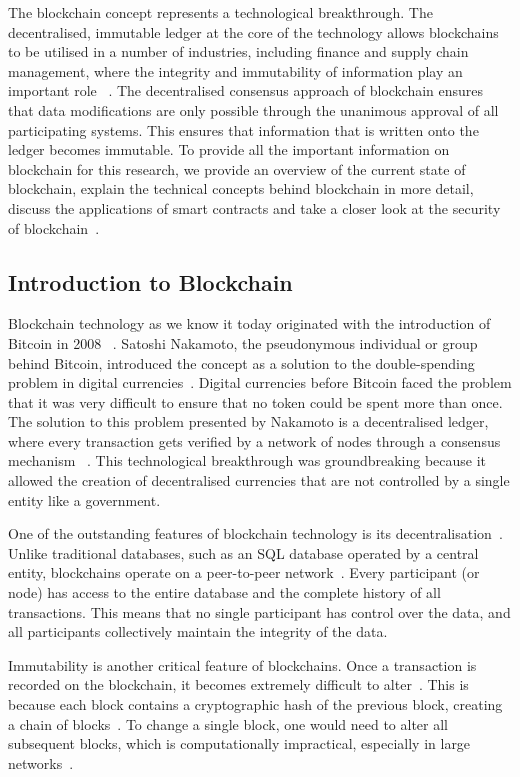 
The blockchain concept represents a technological breakthrough. The decentralised, immutable ledger  at the core of the technology allows blockchains to be utilised in a number of industries, including finance and supply chain management, where the integrity and immutability of information play an important role ~\cite{Zhou.2023}. The decentralised consensus approach of blockchain ensures that data modifications are only possible through the unanimous approval of all participating systems. This ensures that information that is written onto the ledger becomes immutable. To provide all the important information on blockchain for this research, we provide an overview of the current state of blockchain, explain the technical concepts behind blockchain in more detail, discuss the applications of smart contracts and take a closer look at the security of blockchain~\cite{Tran.2022b}.

\subsection{Introduction to Blockchain}
Blockchain technology as we know it today originated with the introduction of Bitcoin in 2008 ~\cite{Nakamoto.2009}. 
Satoshi Nakamoto, the pseudonymous individual or group behind Bitcoin, introduced the concept as a solution to the double-spending problem in digital currencies~\cite{Nakamoto.2009}. Digital currencies before Bitcoin faced the problem that it was very difficult to ensure that no token could be spent more than once. The solution to this problem presented by Nakamoto is a decentralised ledger, where every transaction gets verified by a network of nodes through a consensus mechanism ~\cite{Tran.2022b}. This technological breakthrough was groundbreaking because it allowed the creation of decentralised currencies that are not controlled by a single entity like a government.


One of the outstanding features of blockchain technology is its decentralisation~\cite{Gencer.2018}. Unlike traditional databases, such as an SQL database operated by a central entity, blockchains operate on a peer-to-peer network~\cite{Gencer.2018}. Every participant (or node) has access to the entire database and the complete history of all transactions. This means that no single participant has control over the data, and all participants collectively maintain the integrity of the data.

Immutability is another critical feature of blockchains. Once a transaction is recorded on the blockchain, it becomes extremely difficult to alter~\cite{Pilkington.}. This is because each block contains a cryptographic hash of the previous block, creating a chain of blocks~\cite{Pilkington.}. To change a single block, one would need to alter all subsequent blocks, which is computationally impractical, especially in large networks~\cite{ContedeLeon.2017}.

